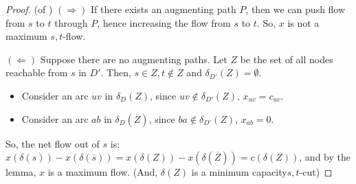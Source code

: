 \begin{proof}{(of )}
    \newline
    $(\Rightarrow)$ If there exists an augmenting path $P$, then we can push flow from $s$ to $t$ through $P$, hence increasing the flow from $s$ to $t$. 
    So, $x$ is not a maximum $s,t$-flow.

    $(\Leftarrow)$ Suppose there are no augmenting paths. Let $Z$ be the set of all nodes reachable from $s$ in $D'$. 
    Then, $s \in Z, t \not\in Z$ and $\delta_{D'}(Z) = \emptyset$.
    \begin{itemize}
        \item Consider an arc $uv$ in $\delta_D(Z)$, since $uv \not\in \delta_{D'}(Z)$, $x_{uv} = c_{uv}$. 
        \item Consider an arc $ab$ in $\delta_D(\overline{Z})$, since $ba \not\in \delta_{D'}(Z)$, $x_{ab} = 0$.
    \end{itemize} 

    \begin{minipage}{0.5\textwidth}
        \centering
      \end{minipage}
      \begin{minipage}{0.5\textwidth}
        \centering
      \end{minipage}
    
      So, the net flow out of $s$ is: $x(\delta(s)) - x(\delta(\overline{s})) = x(\delta(Z)) - x(\delta(\overline{Z})) = c(\delta(Z))$, and by the lemma, $x$ is a maximum flow. (And, $\delta(Z)$ is a minimum capacity$s,t$-cut)
\end{proof}
